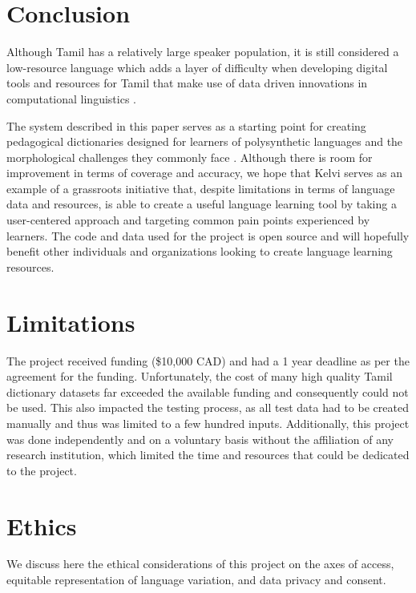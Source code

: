 \documentclass[11pt]{article}
\begin{document}
\section{Conclusion}
Although Tamil has a relatively large speaker population, it is still considered a 
low-resource language which adds a layer of difficulty when developing digital tools 
and resources for Tamil that make use of data driven innovations in 
computational linguistics \citep{tissera_natural_2025}.

The system described in this paper serves as a starting point for 
creating pedagogical dictionaries designed for learners of 
polysynthetic languages and the morphological challenges they 
commonly face \citep{kazantseva_kawennonnis_2018}. 
Although there is room for improvement in terms of coverage and accuracy, 
we hope that Kelvi serves as an example of a grassroots initiative that, 
despite limitations in terms of language data and resources, 
is able to create a useful language learning tool by 
taking a user-centered approach and targeting common pain points 
experienced by learners. The code and data used for the project 
is open source and will hopefully benefit other individuals and 
organizations looking to create language learning resources. 

\section{Limitations} \label{sec:limitations}
The project received funding (\$10,000 CAD) and had a 1 year deadline 
as per the agreement for the funding. Unfortunately, the cost of many 
high quality Tamil dictionary datasets far exceeded the available funding 
and consequently could not be used. This also impacted the testing process, 
as all test data had to be created manually and thus was limited to a few hundred inputs. 
Additionally, this project was done independently and on a voluntary basis 
without the affiliation of any research institution, which limited the time and 
resources that could be dedicated to the project. 

\section{Ethics}
We discuss here the ethical considerations of this project on the axes of access, 
equitable representation of language variation, and data privacy and consent. 
\end{document}
